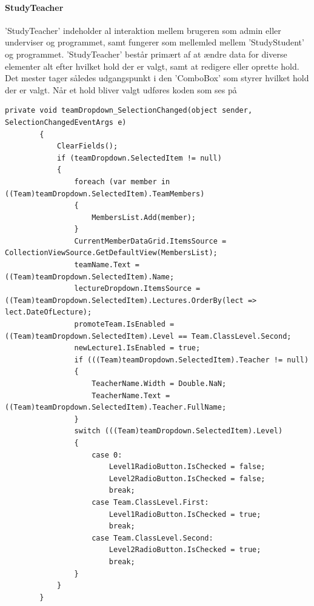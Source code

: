 \paragraph{StudyTeacher}
'StudyTeacher' indeholder al interaktion mellem brugeren som admin eller underviser og programmet, samt fungerer som mellemled mellem 'StudyStudent' og programmet. 'StudyTeacher' består primært af at ændre data for diverse elementer alt efter hvilket hold der er valgt, samt at redigere eller oprette hold. Det mester tager således udgangspunkt i den 'ComboBox' som styrer hvilket hold der er valgt. Når et hold bliver valgt udføres koden som ses på 
\begin{lstlisting}[caption={DropDownTeam SelectionChanged event kode.},
label=TDDSC]
private void teamDropdown_SelectionChanged(object sender, SelectionChangedEventArgs e)
        {
            ClearFields();
            if (teamDropdown.SelectedItem != null)
            {
                foreach (var member in ((Team)teamDropdown.SelectedItem).TeamMembers)
                {
                    MembersList.Add(member);
                }
                CurrentMemberDataGrid.ItemsSource = CollectionViewSource.GetDefaultView(MembersList);
                teamName.Text = ((Team)teamDropdown.SelectedItem).Name;
                lectureDropdown.ItemsSource = ((Team)teamDropdown.SelectedItem).Lectures.OrderBy(lect => lect.DateOfLecture);
                promoteTeam.IsEnabled = ((Team)teamDropdown.SelectedItem).Level == Team.ClassLevel.Second;
                newLecture1.IsEnabled = true;
                if (((Team)teamDropdown.SelectedItem).Teacher != null)
                {
                    TeacherName.Width = Double.NaN;
                    TeacherName.Text = ((Team)teamDropdown.SelectedItem).Teacher.FullName;
                }
                switch (((Team)teamDropdown.SelectedItem).Level)
                {
                    case 0:
                        Level1RadioButton.IsChecked = false;
                        Level2RadioButton.IsChecked = false;
                        break;
                    case Team.ClassLevel.First:
                        Level1RadioButton.IsChecked = true;
                        break;
                    case Team.ClassLevel.Second:
                        Level2RadioButton.IsChecked = true;
                        break;
                }
            }
        }

\end{lstlisting}
